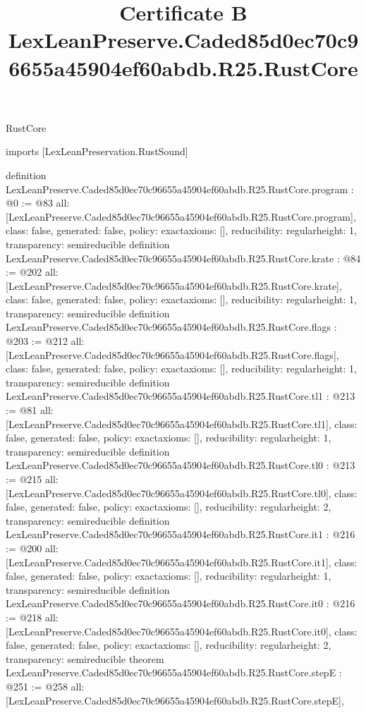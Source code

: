 \begin{lexlean}{RustCore}
\title{Certificate B LexLeanPreserve.Caded85d0ec70c96655a45904ef60abdb.R25.RustCore}
\begin{coremodule}
imports [LexLeanPreservation.RustSound]

definition LexLeanPreserve.Caded85d0ec70c96655a45904ef60abdb.R25.RustCore.program : @0 := @83 {
  all: [LexLeanPreserve.Caded85d0ec70c96655a45904ef60abdb.R25.RustCore.program],
  class: false,
  generated: false,
  policy: exact{axioms: []},
  reducibility: regular{height: 1},
  transparency: semireducible
}
definition LexLeanPreserve.Caded85d0ec70c96655a45904ef60abdb.R25.RustCore.krate : @84 := @202 {
  all: [LexLeanPreserve.Caded85d0ec70c96655a45904ef60abdb.R25.RustCore.krate],
  class: false,
  generated: false,
  policy: exact{axioms: []},
  reducibility: regular{height: 1},
  transparency: semireducible
}
definition LexLeanPreserve.Caded85d0ec70c96655a45904ef60abdb.R25.RustCore.flags : @203 := @212 {
  all: [LexLeanPreserve.Caded85d0ec70c96655a45904ef60abdb.R25.RustCore.flags],
  class: false,
  generated: false,
  policy: exact{axioms: []},
  reducibility: regular{height: 1},
  transparency: semireducible
}
definition LexLeanPreserve.Caded85d0ec70c96655a45904ef60abdb.R25.RustCore.tl1 : @213 := @81 {
  all: [LexLeanPreserve.Caded85d0ec70c96655a45904ef60abdb.R25.RustCore.tl1],
  class: false,
  generated: false,
  policy: exact{axioms: []},
  reducibility: regular{height: 1},
  transparency: semireducible
}
definition LexLeanPreserve.Caded85d0ec70c96655a45904ef60abdb.R25.RustCore.tl0 : @213 := @215 {
  all: [LexLeanPreserve.Caded85d0ec70c96655a45904ef60abdb.R25.RustCore.tl0],
  class: false,
  generated: false,
  policy: exact{axioms: []},
  reducibility: regular{height: 2},
  transparency: semireducible
}
definition LexLeanPreserve.Caded85d0ec70c96655a45904ef60abdb.R25.RustCore.it1 : @216 := @200 {
  all: [LexLeanPreserve.Caded85d0ec70c96655a45904ef60abdb.R25.RustCore.it1],
  class: false,
  generated: false,
  policy: exact{axioms: []},
  reducibility: regular{height: 1},
  transparency: semireducible
}
definition LexLeanPreserve.Caded85d0ec70c96655a45904ef60abdb.R25.RustCore.it0 : @216 := @218 {
  all: [LexLeanPreserve.Caded85d0ec70c96655a45904ef60abdb.R25.RustCore.it0],
  class: false,
  generated: false,
  policy: exact{axioms: []},
  reducibility: regular{height: 2},
  transparency: semireducible
}
theorem LexLeanPreserve.Caded85d0ec70c96655a45904ef60abdb.R25.RustCore.stepE : @251 := @258 {
  all: [LexLeanPreserve.Caded85d0ec70c96655a45904ef60abdb.R25.RustCore.stepE],
}
\end{coremodule}
\end{lexlean}
